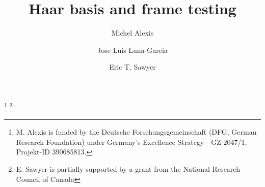 \documentclass{amsart}%
\theoremstyle{plain}
\numberwithin{equation}{section}
\begin{document}
\title{Haar basis and frame testing}
\author[M. Alexis]{Michel Alexis}
\address{Mathematical Institute, University of Bonn, Endenicher Allee 60, 53115, Bonn, Germany}
\author[J. L. Luna-Garcia]{Jose Luis Luna-Garcia}
\address{Department of Mathematics \& Statistics, McMaster University, 1280 Main Street
West, Hamilton, Ontario, Canada L8S 4K1}
\author[E.T. Sawyer]{Eric T. Sawyer}
\address{Department of Mathematics \& Statistics, McMaster University, 1280 Main Street
West, Hamilton, Ontario, Canada L8S 4K1 }
\thanks{M. Alexis is funded by the Deutsche Forschungsgemeinschaft (DFG, German
Research Foundation) under Germany's Excellence Strategy - GZ 2047/1,
Projekt-ID 390685813.}
\thanks{E. Sawyer is partially supported by a grant from the National Research Council
of Canada}
\end{document}
